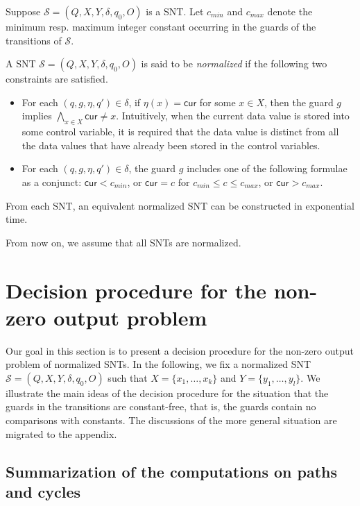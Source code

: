 \documentclass[runningheads,a4paper]{llncs}
\def\Ss{{\mathcal{S} }}
\newcommand\cur{\mathsf{cur}}
\begin{document}
Suppose $\Ss=(Q,X,Y,\delta,q_0,O)$ is a SNT. Let $c_{min}$ and $c_{max}$ denote the minimum resp. maximum integer constant occurring in the guards of the transitions of $\Ss$. 

A SNT $\Ss=(Q,X,Y,\delta,q_0,O)$ is said to be \emph{normalized} if the following two constraints are satisfied.
\begin{itemize}
	\item For each $(q,g,\eta,q') \in \delta$, if $\eta(x)=\cur$ for some $x \in X$, then the guard $g$ implies $\bigwedge \limits_{x \in X} \cur \neq x$.  Intuitively, when the current data value is stored into some control variable, it is required that the data value is distinct from all the data values that have already been stored in the control variables.
	\item For each $(q, g, \eta, q') \in \delta$, the guard $g$ includes one of the following formulae as a conjunct: $\cur < c_{min}$, or $\cur = c$ for $c_{min} \le c \le c_{max}$, or $\cur > c_{max}$.
\end{itemize}


\begin{proposition}\label{prop-snt-norm}
	From each SNT, an equivalent normalized SNT can be constructed in exponential time. 
\end{proposition}

From now on, we assume that all SNTs are normalized. 

\section{Decision procedure for the non-zero output problem}\label{sec-dec-snt}

Our goal in this section is to present a decision procedure for the non-zero output problem of normalized SNTs.  In the following, we fix a normalized SNT $\Ss = (Q,X,Y,\delta,q_0,O)$ such that $X=\{ x_1,\dots, x_k\}$ and $Y = \{y_1,\dots,y_l\}$. We illustrate the main ideas of the decision procedure for the situation that the guards in the transitions are constant-free, that is, the guards contain no comparisons with constants. The discussions of the more general situation are migrated to the appendix. 


\subsection{Summarization of the computations on paths and cycles}
\end{document}
